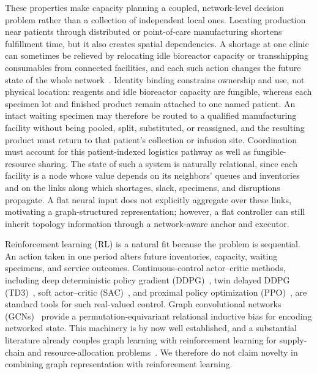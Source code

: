 \documentclass[preprint,review,12pt]{elsarticle}
\begin{document}
These properties make capacity planning a coupled, network-level decision problem rather than a collection of independent local ones. Locating production near patients through distributed or point-of-care manufacturing shortens fulfillment time, but it also creates spatial dependencies. A shortage at one clinic can sometimes be relieved by relocating idle bioreactor capacity or transshipping consumables from connected facilities, and each such action changes the future state of the whole network~\cite{Li2023, Tseng2023DeepRL}. Identity binding constrains ownership and use, not physical location: reagents and idle bioreactor capacity are fungible, whereas each specimen lot and finished product remain attached to one named patient. An intact waiting specimen may therefore be routed to a qualified manufacturing facility without being pooled, split, substituted, or reassigned, and the resulting product must return to that patient's collection or infusion site. Coordination must account for this patient-indexed logistics pathway as well as fungible-resource sharing. The state of such a system is naturally relational, since each facility is a node whose value depends on its neighbors' queues and inventories and on the links along which shortages, slack, specimens, and disruptions propagate. A flat neural input does not explicitly aggregate over these links, motivating a graph-structured representation; however, a flat controller can still inherit topology information through a network-aware anchor and executor.

Reinforcement learning (RL) is a natural fit because the problem is sequential. An action taken in one period alters future inventories, capacity, waiting specimens, and service outcomes. Continuous-control actor--critic methods, including deep deterministic policy gradient (DDPG)~\cite{Lillicrap2016DDPG}, twin delayed DDPG (TD3)~\cite{Fujimoto2018TD3}, soft actor--critic (SAC)~\cite{Haarnoja2018SAC}, and proximal policy optimization (PPO)~\cite{Schulman2017PPO}, are standard tools for such real-valued control. Graph convolutional networks (GCNs)~\cite{Kipf2017GCN} provide a permutation-equivariant relational inductive bias for encoding networked state. This machinery is by now well established, and a substantial literature already couples graph learning with reinforcement learning for supply-chain and resource-allocation problems~\cite{Kotecha2025GNNMARL, Chang2025AAAI, Ahn2024GSP, Ahn2024GPP, Liu2024GNNMARLSurvey}. We therefore do not claim novelty in combining graph representation with reinforcement learning.
\end{document}
